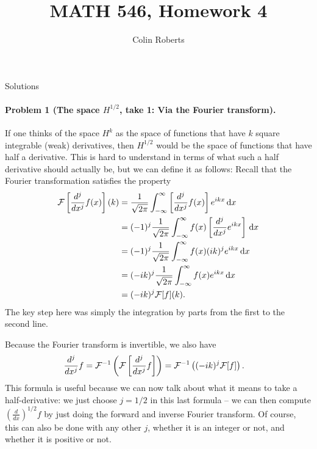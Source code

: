 \documentclass[leqno]{article}
\author{Colin Roberts}
\title{MATH 546, Homework 4}
\theoremstyle{nonumberplain}
\begin{document}
\maketitle
\begin{large}
\begin{center}
Solutions
\end{center}
\end{large}


\paragraph{Problem 1 (The space $H^{1/2}$, take 1: Via the Fourier transform).}
If one thinks of the space $H^k$ as the space of functions that have
$k$ square integrable (weak) derivatives, then $H^{1/2}$ would be the
space of functions that have half a derivative. This is hard to
understand in terms of what such a half derivative should actually be,
but we can define it as follows: Recall that the Fourier
transformation satisfies the property
\begin{align*}
  {\cal F}\left[ \frac{d^j}{dx^j} f(x) \right](k)
  &=
  \frac{1}{\sqrt{2\pi}}
  \int_{-\infty}^{\infty} \left[ \frac{d^j}{dx^j} f(x) \right] e^{ikx}
  \, \text{d}x
  \\
  &=
  (-1)^j
  \frac{1}{\sqrt{2\pi}}
  \int_{-\infty}^{\infty} f(x) \left[ \frac{d^j}{dx^j} e^{ikx}\right] 
  \, \text{d}x
  \\
  &=
  (-1)^j
  \frac{1}{\sqrt{2\pi}}
  \int_{-\infty}^{\infty} f(x) (ik)^j e^{ikx}
  \, \text{d}x
  \\
  &=
  (-ik)^j
  \frac{1}{\sqrt{2\pi}}
  \int_{-\infty}^{\infty} f(x) e^{ikx}
  \, \text{d}x
  \\
  &=
  (-ik)^j {\cal F}[f](k).
\end{align*}
The key step here was simply the integration by parts from the first
to the second line.

Because the Fourier transform is invertible, we also have
\begin{align*}
  \frac{d^j}{dx^j} f
  = {\cal F}^{-1}\left({\cal F}\left[ \frac{d^j}{dx^j} f \right]\right)
  &=
  {\cal F}^{-1}\left((-ik)^j {\cal F}[f]\right).
\end{align*}
This formula is useful because we can now talk about what it means to
take a half-derivative: we just choose $j=1/2$ in this last formula --
we can then compute $\left(\frac{d}{dx}\right)^{1/2} f$ by just doing
the forward and inverse Fourier transform. Of course, this can also be
done with any other $j$, whether it is an integer or not, and whether
it is positive or not.
\end{document}
